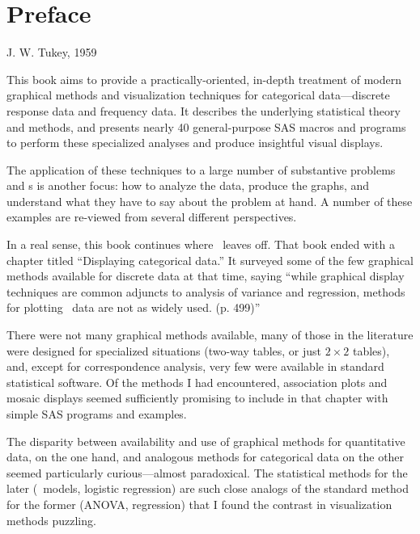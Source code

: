 \chapter{Preface}
\begin{epigraphs}
{J. W. Tukey, 1959\nocite{Tukey:59}}

\end{epigraphs}

This book aims to provide a practically-oriented, in-depth treatment
of modern graphical methods and visualization techniques for
categorical data---discrete response data and frequency data.  It
describes the underlying statistical theory and methods, and presents
nearly 40 general-purpose SAS macros and programs to perform these
specialized analyses and produce insightful visual displays.

The application of these techniques to a large number of substantive
problems and \Dset{}s is another focus: how to analyze the data,
produce the graphs, and understand what they have to say about the
problem at hand.  A number of these examples are re-viewed from
several different perspectives.

In a real sense, this book continues where \SSSG\ leaves off.
That book ended with a chapter titled ``Displaying categorical data.''
It surveyed some of the few graphical methods available for discrete
data at that time, saying ``while graphical display techniques are
common adjuncts to analysis of variance and regression, methods for
plotting \ctab\ data are not as widely used. (p. 499)''

There were not many graphical methods available, many of those
in the literature were designed for specialized situations
(two-way tables, or just $2 \times 2$ tables), and, except for
correspondence analysis, very few were available in standard statistical
software.  Of the methods I had encountered, association plots
and mosaic displays seemed sufficiently promising to include in that
chapter with simple SAS programs and examples.

The disparity between availability and use of graphical methods
for quantitative data, on the one hand, and analogous methods for
categorical data on the other seemed particularly curious---almost
paradoxical.  The statistical methods for the later (\loglin\ models,
logistic regression) are such close analogs of the standard method
for the former (ANOVA, regression) that I found the contrast in
visualization methods puzzling.

